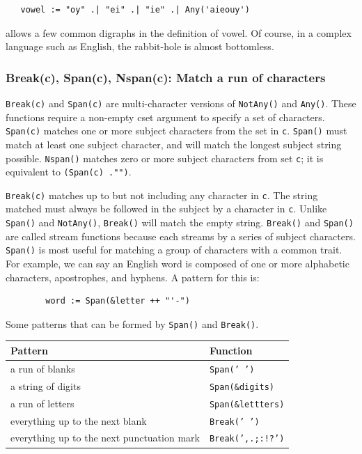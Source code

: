 \documentclass[letterpaper,12pt]{article}
\begin{document}
\begin{verbatim}
   vowel := "oy" .| "ei" .| "ie" .| Any('aieouy')
\end{verbatim}

\noindent
allows a few common digraphs in the definition of vowel.  Of course, in
a complex language such as English, the rabbit-hole is almost bottomless.


\subsubsection{Break(c), Span(c), Nspan(c): Match a run of characters}

{\tt Break(c)} and {\tt Span(c)} are multi-character versions of
{\tt NotAny()} and {\tt Any()}.  These functions
require a non-empty cset argument to specify a set of characters.
{\tt Span(c)} matches one or more subject characters from the set in {\tt c}.
{\tt Span()} must match at least one subject character, and will match
the longest subject string possible.  {\tt Nspan()} matches zero or more
subject characters from set {\tt c}; it is equivalent to
{\tt (Span(c) .\textbar "")}.

{\tt Break(c)} matches up to but not including
any character in {\tt c}. The string matched must always be followed in the
subject by a character in {\tt c}. Unlike {\tt Span()} and {\tt NotAny()},
{\tt Break()}
will match the empty string.  {\tt Break()} and {\tt Span()} are called stream
functions because each streams by a series of subject
characters. {\tt Span()} is most useful for matching a group of characters
with a common trait. For example, we can say an English word is
composed of one or more alphabetic characters, apostrophes, and
hyphens. A pattern for this is:

\begin{verbatim}
        word := Span(&letter ++ "'-")
\end{verbatim}

Some patterns that can be formed by {\tt Span()} and {\tt Break()}.
\begin{table}[h]
\begin{center}
{\begin{tabular}{ | l | l | } \hline 
        Pattern & Function \\ \hline
        a run of blanks & {\tt Span(' ')} \\ \hline
	a string of digits & {\tt Span(\&digits)} \\ \hline
	a run of letters & {\tt Span(\&lettters)} \\ \hline
	everything up to the next blank & {\tt Break(' ')} \\ \hline
	everything up to the next punctuation mark & {\tt Break(',.;:!?')} \\ \hline
\end{tabular}}
\end{center}
\end{table}
\end{document}
